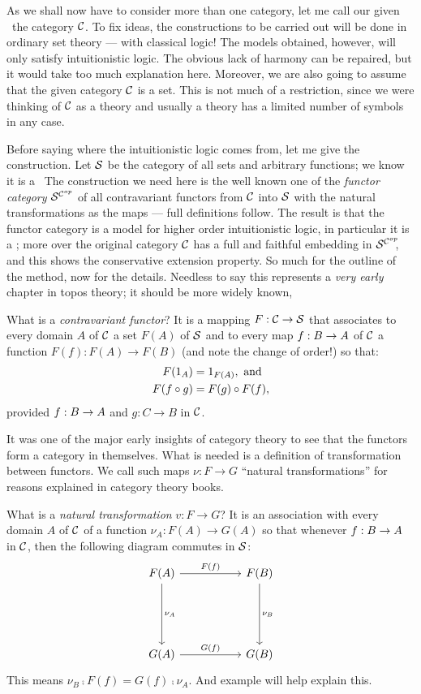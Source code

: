 As we shall now have to consider more than one category, let me call our given \ccc\ the
category $\C$. To fix ideas, the constructions to be carried out will be done in ordinary
set theory --- with classical logic! The models obtained, however, will only satisfy
intuitionistic logic. The obvious lack of harmony can be repaired, but it would take too
much explanation here. Moreover, we are also going to assume that the given category $\C$
is a set. This is not much of a restriction, since we were thinking of $\C$ as a theory
and usually a theory has a limited number of symbols in any case.

Before saying where the intuitionistic logic comes from, let me give the construction. Let
$\S$ be the category of all sets and arbitrary functions; we know it is a \ccc\  The
construction we need here is the well known one of the {\it functor category} $\scop$ of
all contravariant functors from $\C$ into $\S$ with the natural transformations as the
maps --- full definitions follow. The result is that the functor category is a model for
higher order intuitionistic logic, in particular it is a \ccc; more over the original
category $\C$ has a full and faithful embedding in $\scop\!\!$, and this shows the
conservative extension property. So much for the outline of the method, now for the
details. Needless to say this represents a {\it very early} chapter in topos theory; it
should be more widely known,

What is a {\it contravariant functor}? It is a mapping $F: \C\to \S$ that associates to
every domain $A$ of $\C$ a set $F(A)$ of $\S$ and to every map $f: \BA$ of $\C$ a function
$F(f) : F(A) \to F(B)$ (and note the change of order!) so that:
\begin{align*}
F(\id_A) &= \id_{F(A)} , {\textrm{ and}}\\
F(f \comp g) &= F(g) \comp F(f),
\end{align*}
%
provided $f: \BA$ and $g: C \to B$ in $\C$.

It was one of the major early insights of category theory to see that the functors form a
category in themselves. What is needed is a definition of transformation between functors.
We call such maps $\nu : F \to G$ ``natural transformations'' for reasons explained in
category theory books.

What is a {\it natural transformation} $v : F\to G$? It is an association with every
domain $A$ of $\C$ of a function $\nu_A: F(A)\to G(A)$ so that whenever $f : \BA$ in $\C$,
then the following diagram commutes in $\S$:
\[
\begin{tikzcd}[row sep=.75in, column sep = .75in]
    F(A) \arrow{d}{\nu_A} \arrow{r}{F(f)}  & F(B) \arrow{d}{\nu_B} \\
    G(A)  \arrow{r}{G(f)} & G(B)
\end{tikzcd}
\]
This means $\nu_B \comp F(f) = G(f) \comp \nu_A$. And example will help explain this.

